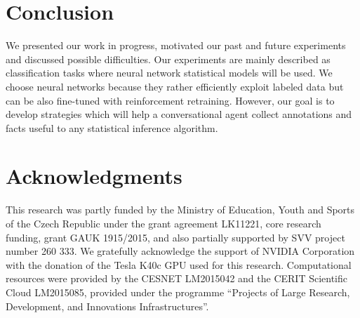\documentclass[11pt]{article}
\begin{document}
\section{Conclusion}
\label{sec:conclusion}
We presented our work in progress, motivated our past and future experiments and discussed possible difficulties.
Our experiments are mainly described as classification tasks where neural network statistical models will be used.
We choose neural networks because they rather efficiently exploit labeled data but can be also fine-tuned with reinforcement retraining.
However, our goal is to develop strategies which will help a conversational agent collect annotations and facts useful to any statistical inference algorithm.

\section*{Acknowledgments}
This research was partly funded by the Ministry of Education, Youth and Sports of the Czech Republic under the grant agreement LK11221, core research funding, grant GAUK 1915/2015, and also partially supported by SVV project number 260 333. 
We gratefully acknowledge the support of NVIDIA Corporation with the donation of the Tesla K40c GPU used for this research.
Computational resources were provided by the CESNET LM2015042 and the CERIT Scientific Cloud LM2015085, provided under the programme ``Projects of Large Research, Development, and Innovations Infrastructures''.



\end{document}
